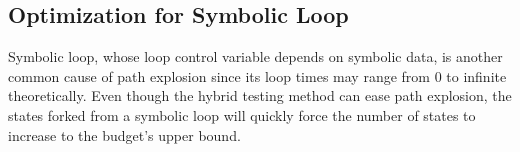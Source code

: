 %
%
%
%
%
%
%
%

\subsection{Optimization for Symbolic Loop}
Symbolic loop, whose loop control variable depends on symbolic data, 
is another common cause of path explosion since its loop times may 
range from 0 to infinite theoretically. 
Even though the hybrid testing method can ease path explosion, the 
states forked from a symbolic loop will quickly force the number of 
states to increase to the budget's upper bound. 

